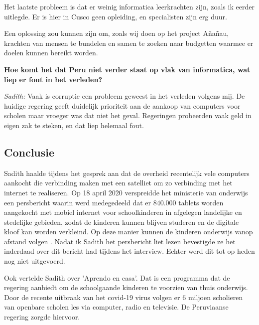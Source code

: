 Het laatste probleem is dat er weinig informatica leerkrachten zijn, zoals ik eerder uitlegde. Er is hier in Cusco geen opleiding, en specialisten zijn erg duur.

Een oplossing zou kunnen zijn om, zoals wij doen op het project Añañau, krachten van mensen te bundelen en samen te zoeken naar budgetten waarmee er doelen kunnen bereikt worden. 

\textbf{Hoe komt het dat Peru niet verder staat op vlak van informatica, wat liep er fout in het verleden?}

\textit{Sadith:} Vaak is corruptie een probleem geweest in het verleden volgens mij. De huidige regering geeft duidelijk prioriteit aan de aankoop van computers voor scholen maar vroeger was dat niet het geval. Regeringen probeerden vaak geld in eigen zak te steken, en dat liep helemaal fout. 
 
\subsection{Conclusie}
Sadith haalde tijdens het gesprek aan dat de overheid recentelijk vele computers aankocht die verbinding maken met een satelliet om zo verbinding met het internet te realiseren. Op 18 april 2020 verspreidde het ministerie van onderwijs een persbericht waarin werd medegedeeld dat er 840.000 tablets worden aangekocht met mobiel internet voor schoolkinderen in afgelegen landelijke en stedelijke gebieden, zodat de kinderen kunnen blijven studeren en de digitale kloof kan worden verkleind. Op deze manier kunnen de kinderen onderwijs vanop afstand volgen \autocite{Minedu2020}. Nadat ik Sadith het persbericht liet lezen bevestigde ze het inderdaad over dit bericht had tijdens het interview. Echter werd dit tot op heden nog niet uitgevoerd. 

Ook vertelde Sadith over 'Aprendo en casa'. Dat is een programma dat de regering aanbiedt om de schoolgaande kinderen te voorzien van thuis onderwijs. Door de recente uitbraak van het covid-19 virus volgen er 6 miljoen scholieren van openbare scholen les via computer, radio en televisie. De Peruviaanse regering zorgde hiervoor. \autocite{Minedu2020a}

